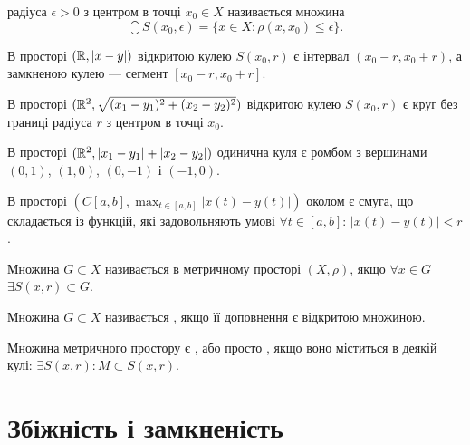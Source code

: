 \begin{definition}
 радіуса $\epsilon > 0$ з центром в
точці $x_0 \in X$ називається множина
\begin{equation*}
    \closure S(x_0, \epsilon) = \{x \in X: \rho(x, x_0) \le \epsilon \}.
\end{equation*}
\end{definition}

\begin{example}
В просторі $(\mathbb{R}, |x - y|)$ відкритою кулею $S(x_0, r)$
є інтервал $(x_0 - r, x_0 + r)$, а замкненою кулею ---
сегмент $[x_0 - r, x_0 + r]$.
\end{example}

\begin{example}
В просторі $(\mathbb{R}^2, \sqrt{(x_1 - y_1)^2 + (x_2 - y_2)^2})$ відкритою
кулею $S(x_0, r)$ є круг без границі радіуса $r$ з центром в точці $x_0$.
\end{example}

\begin{example}
В просторі $(\mathbb{R}^2, |x_1 - y_1| + |x_2 - y_2|)$ одинична
куля є ромбом з вершинами $(0, 1)$, $(1, 0)$, $(0, -1)$ і $(-1, 0)$.
\end{example}

\begin{example}
В просторі $\left( C[a, b], \max_{t \in [a, b]} |x(t) - y(t)| \right)$
околом є смуга, що складається із функцій, які
задовольняють умові $\forall t \in [a, b]$: $|x(t) - y (t)| < r$.
\end{example}

\begin{definition}
Множина $G \subset  X$ називається  в
метричному просторі $(X, \rho)$, якщо $\forall x \in G$ $\exists S(x, r) \subset G$.
\end{definition}

\begin{definition}
Множина $G \subset X$ називається , якщо
її доповнення є відкритою множиною.
\end{definition}

\begin{definition}
Множина метричного простору є , або просто , якщо воно
міститься в деякій кулі: $\exists S(x, r): M \subset S(x, r)$.
\end{definition}

\section{Збіжність і замкненість}

